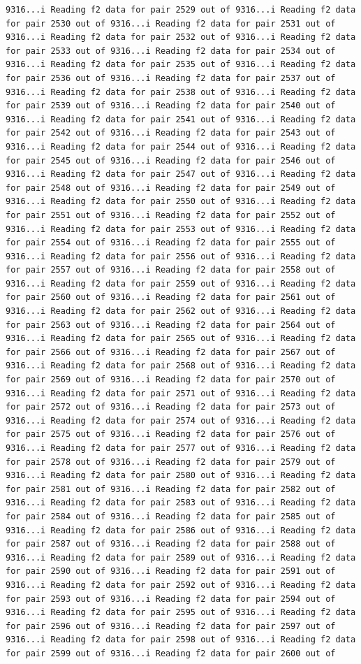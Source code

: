 \documentclass[
]{article}
\begin{document}
\begin{verbatim}
9316...i Reading f2 data for pair 2529 out of 9316...i Reading f2 data for pair 2530 out of 9316...i Reading f2 data for pair 2531 out of 9316...i Reading f2 data for pair 2532 out of 9316...i Reading f2 data for pair 2533 out of 9316...i Reading f2 data for pair 2534 out of 9316...i Reading f2 data for pair 2535 out of 9316...i Reading f2 data for pair 2536 out of 9316...i Reading f2 data for pair 2537 out of 9316...i Reading f2 data for pair 2538 out of 9316...i Reading f2 data for pair 2539 out of 9316...i Reading f2 data for pair 2540 out of 9316...i Reading f2 data for pair 2541 out of 9316...i Reading f2 data for pair 2542 out of 9316...i Reading f2 data for pair 2543 out of 9316...i Reading f2 data for pair 2544 out of 9316...i Reading f2 data for pair 2545 out of 9316...i Reading f2 data for pair 2546 out of 9316...i Reading f2 data for pair 2547 out of 9316...i Reading f2 data for pair 2548 out of 9316...i Reading f2 data for pair 2549 out of 9316...i Reading f2 data for pair 2550 out of 9316...i Reading f2 data for pair 2551 out of 9316...i Reading f2 data for pair 2552 out of 9316...i Reading f2 data for pair 2553 out of 9316...i Reading f2 data for pair 2554 out of 9316...i Reading f2 data for pair 2555 out of 9316...i Reading f2 data for pair 2556 out of 9316...i Reading f2 data for pair 2557 out of 9316...i Reading f2 data for pair 2558 out of 9316...i Reading f2 data for pair 2559 out of 9316...i Reading f2 data for pair 2560 out of 9316...i Reading f2 data for pair 2561 out of 9316...i Reading f2 data for pair 2562 out of 9316...i Reading f2 data for pair 2563 out of 9316...i Reading f2 data for pair 2564 out of 9316...i Reading f2 data for pair 2565 out of 9316...i Reading f2 data for pair 2566 out of 9316...i Reading f2 data for pair 2567 out of 9316...i Reading f2 data for pair 2568 out of 9316...i Reading f2 data for pair 2569 out of 9316...i Reading f2 data for pair 2570 out of 9316...i Reading f2 data for pair 2571 out of 9316...i Reading f2 data for pair 2572 out of 9316...i Reading f2 data for pair 2573 out of 9316...i Reading f2 data for pair 2574 out of 9316...i Reading f2 data for pair 2575 out of 9316...i Reading f2 data for pair 2576 out of 9316...i Reading f2 data for pair 2577 out of 9316...i Reading f2 data for pair 2578 out of 9316...i Reading f2 data for pair 2579 out of 9316...i Reading f2 data for pair 2580 out of 9316...i Reading f2 data for pair 2581 out of 9316...i Reading f2 data for pair 2582 out of 9316...i Reading f2 data for pair 2583 out of 9316...i Reading f2 data for pair 2584 out of 9316...i Reading f2 data for pair 2585 out of 9316...i Reading f2 data for pair 2586 out of 9316...i Reading f2 data for pair 2587 out of 9316...i Reading f2 data for pair 2588 out of 9316...i Reading f2 data for pair 2589 out of 9316...i Reading f2 data for pair 2590 out of 9316...i Reading f2 data for pair 2591 out of 9316...i Reading f2 data for pair 2592 out of 9316...i Reading f2 data for pair 2593 out of 9316...i Reading f2 data for pair 2594 out of 9316...i Reading f2 data for pair 2595 out of 9316...i Reading f2 data for pair 2596 out of 9316...i Reading f2 data for pair 2597 out of 9316...i Reading f2 data for pair 2598 out of 9316...i Reading f2 data for pair 2599 out of 9316...i Reading f2 data for pair 2600 out of 
\end{verbatim}
\end{document}
